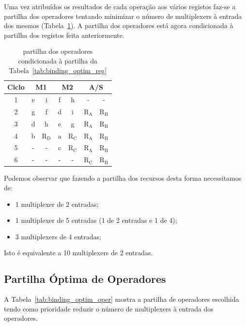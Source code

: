 \documentclass[a4paper]{article}
\begin{document}
Uma vez atribuídos os resultados de cada operação aos vários registos faz-se a partilha dos operadores tentando minimizar o número de multiplexers à entrada dos mesmos (Tabela~\ref{tab:binding_operadores}). A partilha dos operadores está agora condicionada à partilha dos registos feita anteriormente.

\begin{table}[H]
	\centering
	\begin{tabular}{|c||cc|cc|cc|}
		\hline 
		Ciclo & \multicolumn{2}{c|}{M1} & \multicolumn{2}{c|}{M2} & \multicolumn{2}{c|}{A/S} \\ 
		\hline 
		\hline
		1 & e & i & f & h & - & - \\ 
		\hline 
		2 & g & f & d & i & $\mathrm{R_A}$ & $\mathrm{R_B}$ \\ 
		\hline 
		3 & d & h & e & g & $\mathrm{R_A}$ & $\mathrm{R_B}$ \\ 
		\hline 
		4 & b & $\mathrm{R_D}$ & a & $\mathrm{R_C}$ & $\mathrm{R_A}$ & $\mathrm{R_B}$ \\ 
		\hline 
		5 & - & - & c & $\mathrm{R_C}$ & $\mathrm{R_A}$ & $\mathrm{R_B}$ \\ 
		\hline 
		6 & - & - & - & - & $\mathrm{R_C}$ & $\mathrm{R_B}$ \\ 
		\hline 
	\end{tabular}
	\caption{partilha dos operadores condicionada à partilha da \mbox{Tabela~\ref{tab:binding_optim_reg}}}
	\label{tab:binding_operadores}
\end{table}

Podemos observar que fazendo a partilha dos recursos desta forma necessitamos de:
\begin{itemize}
	\item 1 multiplexer de 2 entradas;
	\item 1 multiplexer de 5 entradas (1 de 2 entradas e 1 de 4);
	\item 3 multiplexers de 4 entradas;
\end{itemize}
Isto é equivalente a 10 multiplexers de 2 entradas.

\subsection{Partilha Óptima de Operadores}

A Tabela~\ref{tab:binding_optim_oper} mostra a partilha de operadores escolhida tendo como prioridade reduzir o número de multiplexers à entrada dos operadores.
\end{document}
